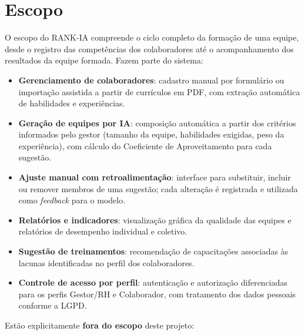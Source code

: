 \documentclass[a4paper,12pt,oneside,openany]{book}
\newif\iforientacoes
\newcommand{\orientacao}[1]{%
    \iforientacoes
        \begin{quote}
        \small\itshape\textbf{Orientação:} #1
        \end{quote}
    \fi
}
\begin{document}
\section{Escopo}

\orientacao{Delimitem o que faz parte do sistema e, quando necessário, o que
está explicitamente fora do escopo. Evitem transformar esta seção em uma
especificação detalhada de requisitos.}

O escopo do RANK-IA compreende o ciclo completo da formação de uma equipe, desde
o registro das competências dos colaboradores até o acompanhamento dos resultados
da equipe formada. Fazem parte do sistema:

\begin{itemize}[nosep]
    \item \textbf{Gerenciamento de colaboradores}: cadastro manual por
    formulário ou importação assistida a partir de currículos em PDF, com
    extração automática de habilidades e experiências.
    \item \textbf{Geração de equipes por IA}: composição automática a partir
    dos critérios informados pelo gestor (tamanho da equipe, habilidades
    exigidas, peso da experiência), com cálculo do Coeficiente de Aproveitamento
    para cada sugestão.
    \item \textbf{Ajuste manual com retroalimentação}: interface para
    substituir, incluir ou remover membros de uma sugestão; cada alteração é
    registrada e utilizada como \textit{feedback} para o modelo.
    \item \textbf{Relatórios e indicadores}: visualização gráfica da qualidade
    das equipes e relatórios de desempenho individual e coletivo.
    \item \textbf{Sugestão de treinamentos}: recomendação de capacitações
    associadas às lacunas identificadas no perfil dos colaboradores.
    \item \textbf{Controle de acesso por perfil}: autenticação e autorização
    diferenciadas para os perfis Gestor/RH e Colaborador, com tratamento dos
    dados pessoais conforme a LGPD.
\end{itemize}

Estão explicitamente \textbf{fora do escopo} deste projeto:
\end{document}
